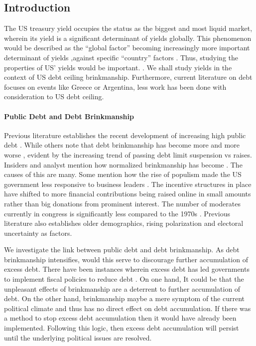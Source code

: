 \documentclass[
  12pt]{article}
\let\oldparagraph\paragraph
\renewcommand{\paragraph}[1]{\oldparagraph{#1}\mbox{}}
\begin{document}
\hypertarget{introduction}{%
\subsection{Introduction}\label{introduction}}

The US treasury yield occupies the status as the biggest and most liquid
market, wherein its yield is a significant determinant of yields
globally. This phenomenon would be described as the ``global factor''
becoming increasingly more important determinant of yields ,against
specific ``country'' factors \citep{mauro2002}. Thus, studying the
properties of US' yields would be important.
\citep{rozada2006, gonzález-rozada2008, longstaff2011}. We shall study
yields in the context of US debt ceiling brinkmanship. Furthermore,
current literature on debt focuses on events like Greece or Argentina,
less work has been done with consideration to US debt ceiling.

\hypertarget{public-debt-and-debt-brinkmanship}{%
\paragraph{Public Debt and Debt
Brinkmanship}\label{public-debt-and-debt-brinkmanship}}

Previous literature establishes the recent development of increasing
high public debt \citep[ ]{mitchener2023}. While others note that debt
brinkmanship has become more and more worse \citep{berman} , evident by
the increasing trend of passing debt limit suspension vs raises.
Insiders and analyst mention how normalized brinkmanship has become
\citep{bivens}. The causes of this are many. Some mention how the rise
of populism made the US government less responsive to business leaders
\citep{cook2023} . The incentive structures in place have shifted to
more financial contributions being raised online in small amounts rather
than big donations from prominent interest. The number of moderates
currently in congress is significantly less compared to the 1970s
\citep{desilver2022}. Previous literature also establishes older
demographics, rising polarization and electoral uncertainty as factors.

We investigate the link between public debt and debt brinkmanship. As
debt brinkmanship intensifies, would this serve to discourage further
accumulation of excess debt. There have been instances wherein excess
debt has led governments to implement fiscal policies to reduce debt
\citep{pfeil, yared2019}. On one hand, It could be that the unpleasant
effects of brinkmanship are a deterrent to further accumulation of debt.
On the other hand, brinkmanship maybe a mere symptom of the current
political climate and thus has no direct effect on debt accumulation. If
there was a method to stop excess debt accumulation then it would have
already been implemented. Following this logic, then excess debt
accumulation will persist until the underlying political issues are
resolved.
\end{document}
